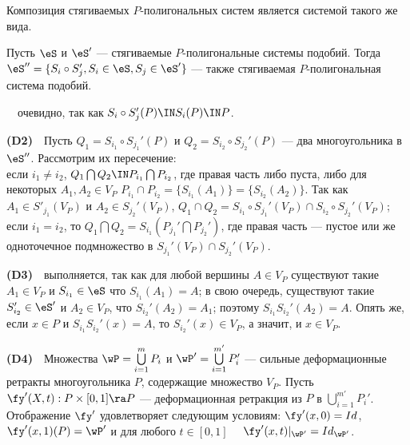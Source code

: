 Композиция  стягиваемых $P$-полигональных систем является  системой такого же вида.

\begin{lemma} Пусть $\eS$ и ${\eS'}$ --- стягиваемые $P$-полигональные системы  подобий.
Тогда  ${\eS}'' = \{S_i \circ S_j', S_i \in {\eS}, S_j \in
{\eS}'\}$ --- также стягиваемая $P$-полигональная  система подобий.\end{lemma}

\ \ очевидно, так как $S_i \circ S_j'(P) \IN S_i (P) \IN P$.

{\bf(D2)}\ \ Пусть $Q_1 =S_{i_1}\circ S_{j_1}' (P)$ и $Q_2 = S_{i_2}\circ S_{j_2}' (P)$ --- два многоугольника в ${\eS}''$. Рассмотрим их пересечение:\\
если $i_1 \ne i_2$,  $Q_1 \bigcap Q_2 \IN P_{i_1} \bigcap P_{i_2}$,
  где правая часть  либо пуста, либо для некоторых $A_1, A_2\in V_P$ \quad  $P_{i_1}\cap P_{i_2}=\{S_{i_1}(A_1)\}= \{S_{i_2}(A_2)\}$. Так как $A_1\in S'_{j_1}(V_P)$ и $A_2\in S_{j_2}'(V_P)$, $Q_1\cap Q_2 =S_{i_1}\circ S_{j_1}' (V_P) \cap S_{i_2}\circ S_{j_2}' (V_P)$;\\     
    если $i_1 = i_2$, то  $Q_1 \bigcap Q_2 = S_{i_1} (P_{j_1}' \bigcap P_{j_2}')$,
 где правая часть --- пустое или же одноточечное подмножество в $S_{j_1}'(V_P)\cap S_{j_2}'(V_P)$.
 
{\bf(D3)}\ \   выполняется, так как для любой вершины $A\in V_P$  существуют такие $A_1\in V_P$ и  $S_{i_1}\in \eS$  что $S_{i_1}(A_{1})=A $; в свою очередь, существуют такие $S_{i_2}'\in \eS'$ и $A_{2}\in V_P$, что $S_{i_2}'(A_2)=A_1$; поэтому $S_{i_1}S_{i_2}'(A_2)=A$. Опять же, если $x\in P$ и $S_{i_1}S_{i_2}'(x)=A$, то $S_{i_2}'(x)\in V_P$, а значит, и $x\in V_P$.

{\bf(D4)}\ \ Множества $\wP=\bigcup \limits_{i = 1}^m P_i$ и
$\wP'=\bigcup \limits_{i = 1}^{m'} P_i'$ --- сильные деформационные
ретракты многоугольника $P$, содержащие множество $V_P$. Пусть ${\fy}' (X, t): P \times [0, 1] \ra P$ ---
деформационная ретракция из $P$ в $\mathop{\bigcup}\limits_{i =
1}^{m'} P_i'$. Отображение $\fy'$ удовлетворяет следующим
условиям:
 ${\fy}' (x, 0) = Id$, ${\fy}' (x, 1) (P) = {\wP}'$ и для любого $t\in[0,1]$ \ \ 
${{\fy}' (x, t)}|_{{\wP}'} = {Id}_{{\wP}'}$.

